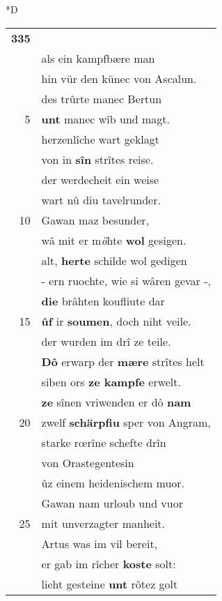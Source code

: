 \documentclass[8pt,a4paper,notitlepage]{article}
\begin{document}
\begin{table}[ht]
\begin{minipage}[t]{0.5\linewidth}
\small
\begin{center}*D
\end{center}
\begin{tabular}{rl}
\textbf{335} & \textbf{\begin{large}D\end{large}ô} bereite \textbf{ouch} sich hêr Gawan\\ 
 & als ein kampfbære man\\ 
 & hin vür den künec von Ascalun.\\ 
 & des trûrte manec Bertun\\ 
5 & \textbf{unt} manec wîb und magt.\\ 
 & herzenlîche wart geklagt\\ 
 & von in \textbf{sîn} strîtes reise.\\ 
 & der werdecheit ein weise\\ 
 & wart nû diu tavelrunder.\\ 
10 & Gawan maz besunder,\\ 
 & wâ mit er m\textit{ö}hte \textbf{wol} gesigen.\\ 
 & alt, \textbf{herte} schilde wol gedigen\\ 
 & - ern ruochte, wie si wâren gevar -,\\ 
 & \textbf{die} brâhten koufliute dar\\ 
15 & \textbf{ûf} ir \textbf{soumen}, doch niht veile.\\ 
 & der wurden im drî ze teile.\\ 
 & \textbf{Dô} erwarp der \textbf{mære} strîtes helt\\ 
 & siben ors \textbf{ze kampfe} erwelt.\\ 
 & \textbf{ze} sînen vriwenden er dô \textbf{nam}\\ 
20 & zwelf \textbf{schärpfiu} sper von Angram,\\ 
 & starke rœrîne schefte drîn\\ 
 & von Orastegentesin\\ 
 & ûz einem heidenischem muor.\\ 
 & Gawan nam urloub und vuor\\ 
25 & mit unverzagter manheit.\\ 
 & Artus was im vil bereit,\\ 
 & er gab im rîcher \textbf{koste} solt:\\ 
 & lieht gesteine \textbf{unt} rôtez golt\\ 

\end{tabular}
\end{minipage}
\end{table}
\end{document}
